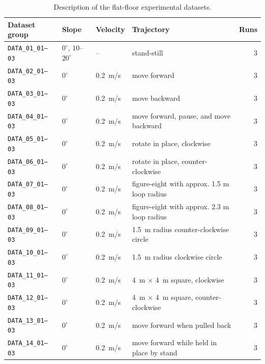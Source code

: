 \documentclass[report.tex]{subfiles}
\begin{document}
    \begin{table}[!htbp]
    \centering
    \caption{Description of the flat-floor experimental datasets.}
    \label{tab:flat-terrain-experiments}
    \small
    \setlength{\tabcolsep}{3pt}
    \begin{tabular}{@{}p{}p{}p{}p{}r@{}}
        \toprule
        Dataset group & Slope & Velocity & Trajectory & Runs \\
        \midrule
        \texttt{DATA\_01\_01--03} & $0^\circ$, $10$--$20^\circ$ & --    & stand-still & 3 \\
        \texttt{DATA\_02\_01--03} & $0^\circ$ & 0.2~m/s                 & move forward & 3 \\
        \texttt{DATA\_03\_01--03} & $0^\circ$ & 0.2~m/s                 & move backward & 3 \\
        \texttt{DATA\_04\_01--03} & $0^\circ$ & 0.2~m/s                 & move forward, pause, and move backward & 3 \\
        \texttt{DATA\_05\_01--03} & $0^\circ$ & 0.2~m/s                 & rotate in place, clockwise & 3 \\
        \texttt{DATA\_06\_01--03} & $0^\circ$ & 0.2~m/s                 & rotate in place, counter-clockwise & 3 \\
        \texttt{DATA\_07\_01--03} & $0^\circ$ & 0.2~m/s                 & figure-eight with approx. 1.5 m loop radius& 3 \\
        \texttt{DATA\_08\_01--03} & $0^\circ$ & 0.2~m/s                 & figure-eight with approx. 2.3 m loop radius& 3 \\
        \texttt{DATA\_09\_01--03} & $0^\circ$ & 0.2~m/s                 & 1.5~m radius counter-clockwise circle & 3 \\
        \texttt{DATA\_10\_01--03} & $0^\circ$ & 0.2~m/s                 & 1.5~m radius clockwise circle & 3 \\
        \texttt{DATA\_11\_01--03} & $0^\circ$ & 0.2~m/s                 & 4~m $\times$ 4~m square, clockwise & 3 \\
        \texttt{DATA\_12\_01--03} & $0^\circ$ & 0.2~m/s                 & 4~m $\times$ 4~m square, counter-clockwise & 3 \\
        \texttt{DATA\_13\_01--03} & $0^\circ$ & 0.2~m/s                 & move forward when pulled back & 3 \\
        \texttt{DATA\_14\_01--03} & $0^\circ$ & 0.2~m/s                 & move forward while held in place by stand & 3 \\

\end{tabular}
\end{table}
\end{document}
